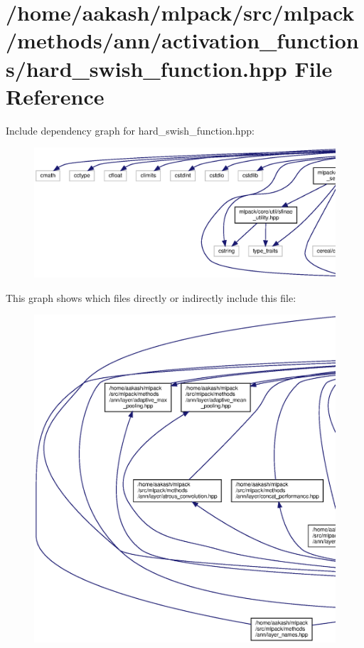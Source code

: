 \section{/home/aakash/mlpack/src/mlpack/methods/ann/activation\+\_\+functions/hard\+\_\+swish\+\_\+function.hpp File Reference}
\label{hard__swish__function_8hpp}
Include dependency graph for hard\+\_\+swish\+\_\+function.\+hpp\+:
\nopagebreak
\begin{figure}[H]
\begin{center}
\leavevmode
\includegraphics[width=350pt]{hard__swish__function_8hpp__incl}
\end{center}
\end{figure}
This graph shows which files directly or indirectly include this file\+:
\nopagebreak
\begin{figure}[H]
\begin{center}
\leavevmode
\includegraphics[width=350pt]{hard__swish__function_8hpp__dep__incl}
\end{center}
\end{figure}

